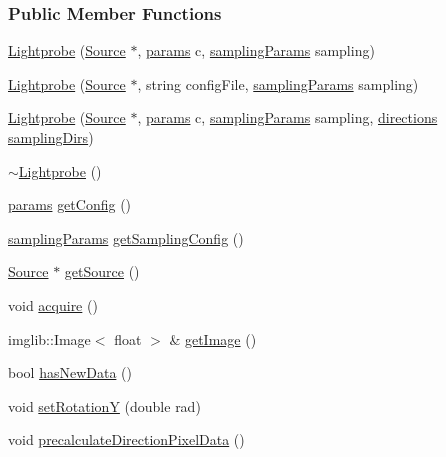 \subsubsection*{\-Public \-Member \-Functions}
\begin{DoxyCompactItemize}
\item 
\hyperlink{classLightprobe_af35628975adf15e7baa3276bc07dee67}{\-Lightprobe} (\hyperlink{classSource}{\-Source} $\ast$, \hyperlink{structLightprobe_1_1params}{params} c, \hyperlink{structLightprobe_1_1samplingParams}{sampling\-Params} sampling)
\item 
\hyperlink{classLightprobe_a79eaa4f155d473b11d0d8542dd19b9ea}{\-Lightprobe} (\hyperlink{classSource}{\-Source} $\ast$, string config\-File, \hyperlink{structLightprobe_1_1samplingParams}{sampling\-Params} sampling)
\item 
\hyperlink{classLightprobe_af7fb7a3f8c3b27f6c79452a27689a2ce}{\-Lightprobe} (\hyperlink{classSource}{\-Source} $\ast$, \hyperlink{structLightprobe_1_1params}{params} c, \hyperlink{structLightprobe_1_1samplingParams}{sampling\-Params} sampling, \hyperlink{utils_8h_aac426d8086789d4d7e318436071c9754}{directions} \hyperlink{classLightprobe_ad3aa93672a623bfb704576c466a7769e}{sampling\-Dirs})
\item 
\hyperlink{classLightprobe_ae9b07c8d066a0e11fd507abbea58c9f1}{$\sim$\-Lightprobe} ()
\item 
\hyperlink{structLightprobe_1_1params}{params} \hyperlink{classLightprobe_aeae57bb50a4a34a0b4493edc7105aa14}{get\-Config} ()
\item 
\hyperlink{structLightprobe_1_1samplingParams}{sampling\-Params} \hyperlink{classLightprobe_af3318a51889cd0eb6be10db8a687e35a}{get\-Sampling\-Config} ()
\item 
\hyperlink{classSource}{\-Source} $\ast$ \hyperlink{classLightprobe_a51a1d2400e449cf562711edfb156a007}{get\-Source} ()
\item 
void \hyperlink{classLightprobe_ad0b80ec6a606302dbe8824531efe51ea}{acquire} ()
\item 
imglib\-::\-Image$<$ float $>$ \& \hyperlink{classLightprobe_ad088c4138632e186fadf2113877f3ee7}{get\-Image} ()
\item 
bool \hyperlink{classLightprobe_a3a02a401ef6e2128facb9402778b21e8}{has\-New\-Data} ()
\item 
void \hyperlink{classLightprobe_a54bc0e1006b77cd3dd13b1683a6ada5c}{set\-Rotation\-Y} (double rad)
\item 
void \hyperlink{classLightprobe_ae5622bdea250c1257a798c0f3a3928f5}{precalculate\-Direction\-Pixel\-Data} ()

\end{DoxyCompactItemize}
